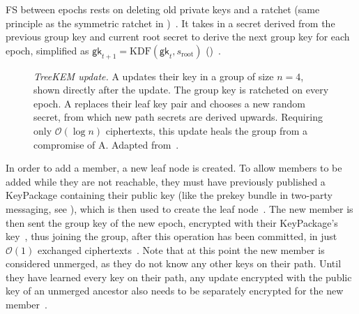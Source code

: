 \documentclass[conference]{IEEEtran}
\begin{document}
\ac{FS} between epochs rests on deleting old private keys and a ratchet (same principle as the symmetric ratchet in )~\cite{barnesMessagingLayerSecurity2023,alwenInsiderSecurityMLS2022}.
It takes in a secret derived from the previous group key and current root secret to derive the next group key for each epoch, simplified as $\mathsf{gk}_{t+1} = \mathrm{KDF}(\mathsf{gk}_t, s_{\mathrm{root}})$ ()~\cite{barnesMessagingLayerSecurity2023}.

\begin{figure}[!t]
    \centering
    
    \par
    \begin{minipage}[t]{\columnwidth}
        \caption{%
            \emph{Sender Keys update.}
            A updates their key in a group of size $n=4$, shown directly after the update.
            A's chain key is ratcheted on every message.
            On an update, A replaces the current chain key by distributing a fresh chain key over the pairwise channels.
            Notably, this only heals A's key.
            Adapted from~\cite{perrinDoubleRatchetAlgorithm}.
        }
        \label{fig:update-sk}
    \end{minipage}\hfill
    \begin{minipage}[t]{\columnwidth}
        \caption{%
            \emph{TreeKEM update.}
            A updates their key in a group of size $n=4$, shown directly after the update.
            The group key is ratcheted on every epoch.
            A replaces their leaf key pair and chooses a new random secret, from which new path secrets are derived upwards.
            Requiring only $\mathcal{O}(\log n)$ ciphertexts, this update heals the group from a compromise of A.
            Adapted from~\cite{barnesMessagingLayerSecurity2023}.
        }
        \label{fig:update-treekem}
    \end{minipage}
\end{figure}

In order to add a member, a new leaf node is created.
To allow members to be added while they are not reachable, they must have previously published a KeyPackage containing their public key (like the prekey bundle in two-party messaging, see ), which is then used to create the leaf node~\cite{barnesMessagingLayerSecurity2023}.
The new member is then sent the group key of the new epoch, encrypted with their KeyPackage's key~\cite{barnesMessagingLayerSecurity2023}, thus joining the group, after this operation has been committed, in just $\mathcal{O}(1)$ exchanged ciphertexts~\cite{barnesMessagingLayerSecurity2023}.
Note that at this point the new member is considered unmerged, as they do not know any other keys on their path.
Until they have learned every key on their path, any update encrypted with the public key of an unmerged ancestor also needs to be separately encrypted for the new member~\cite{barnesMessagingLayerSecurity2023}.
\end{document}
